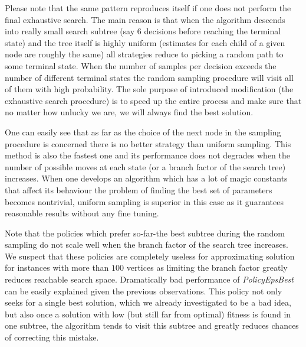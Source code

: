Please note that the same pattern reproduces itself if one does not perform the
final exhaustive search. The main reason is that when the algorithm descends
into really small search subtree (say $6$ decisions before reaching the
terminal state) and the tree itself is highly uniform (estimates for each
child of a given node are roughly the same) all strategies reduce to picking a
random path to some terminal state. When the number of samples per decision
exceeds the number of different terminal states the random sampling procedure
will visit all of them with high probability. The sole purpose of introduced
modification (the exhaustive search procedure) is to speed up the entire process
and make sure that no matter how unlucky we are, we will always find the best
solution.

One can easily see that as far as the choice of the next node in the sampling
procedure is concerned there is no better strategy than uniform sampling. This
method is also the fastest one and its performance does not degrades when the
number of possible moves at each state (or a branch factor of the search tree)
increases. When one develops an algorithm which has a lot of magic constants
that affect its behaviour the problem of finding the best set of parameters
becomes nontrivial, uniform sampling is superior in this case as it guarantees
reasonable results without any fine tuning.

Note that the policies which prefer so-far-the best subtree during the random
sampling do not scale well when the branch factor of the search tree increases.
We suspect that these policies are completely useless for approximating
solution for instances with more than $100$ vertices as limiting the branch
factor greatly reduces reachable search space. Dramatically bad performance of
\emph{PolicyEpsBest} can be easily explained given the previous observations.
This policy not only seeks for a single best solution, which we already
investigated to be a bad idea, but also once a solution with low (but still far
from optimal) fitness is found in one subtree, the algorithm tends to visit
this subtree and greatly reduces chances of correcting this mistake.
